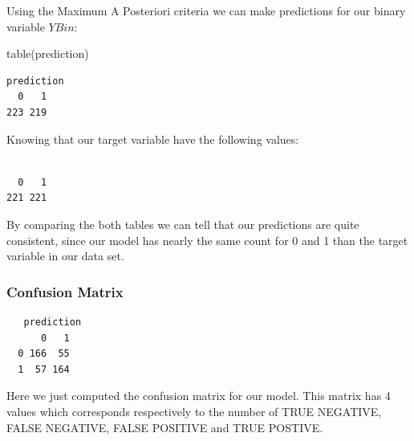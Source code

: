 \documentclass[
]{article}
\newenvironment{Shaded}{\begin{snugshade}}{\end{snugshade}}
\newcommand{\FunctionTok}[1]{\textcolor[rgb]{0.00,0.00,0.00}{#1}}
\newcommand{\NormalTok}[1]{#1}
\newcommand{\OtherTok}[1]{\textcolor[rgb]{0.56,0.35,0.01}{#1}}
\newcommand{\SpecialCharTok}[1]{\textcolor[rgb]{0.00,0.00,0.00}{#1}}
\begin{document}
Using the Maximum A Posteriori criteria we can make predictions for our
binary variable \(YBin\):

\begin{Shaded}
\begin{Highlighting}[]
\FunctionTok{table}\NormalTok{(prediction)}
\end{Highlighting}
\end{Shaded}

\begin{verbatim}
prediction
  0   1 
223 219 
\end{verbatim}

Knowing that our target variable have the following values:

\begin{Shaded}
\end{Shaded}

\begin{verbatim}

  0   1 
221 221 
\end{verbatim}

By comparing the both tables we can tell that our predictions are quite
consistent, since our model has nearly the same count for 0 and 1 than
the target variable in our data set.

\hypertarget{confusion-matrix}{%
\subsubsection{Confusion Matrix}\label{confusion-matrix}}

\begin{Shaded}
\end{Shaded}

\begin{verbatim}
   prediction
      0   1
  0 166  55
  1  57 164
\end{verbatim}

Here we just computed the confusion matrix for our model. This matrix
has 4 values which corresponds respectively to the number of TRUE
NEGATIVE, FALSE NEGATIVE, FALSE POSITIVE and TRUE POSTIVE.
\end{document}
